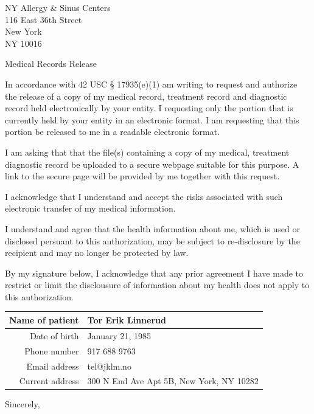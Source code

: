 \documentclass[10pt]{letter}
\makeatletter
\renewcommand{\closing}[1]{\par\nobreak\vspace{\parskip}%
\stopbreaks
\noindent
\ifx\@empty\fromaddress\else
\hspace*{\longindentation}\fi
\parbox{\indentedwidth}{\raggedright
    \ignorespaces #1\\[0.0in]%
    \ifx\@empty\fromsig
        \fromname
\else \fromsig \fi\strut}%
\par}
\makeatother
\begin{document}
\begin{letter}{NY Allergy \& Sinus Centers \\ 116 East 36th Street\\ New York\\ NY 10016}

\opening{Medical Records Release}

In accordance with 42 USC § 17935(e)(1) am writing to request and authorize the release of a copy of my medical record, treatment record and diagnostic record held  electronically by your entity. I requesting only the portion that is currently held by your entity in an electronic format. I am requesting that this portion be released to me in a readable electronic format.

I am asking that that the file(s) containing a copy of my medical, treatment diagnostic record be uploaded to a secure webpage suitable for this purpose. A link to the secure page will be provided by me together with this request.

I acknowledge that I understand and accept the risks associated with such electronic transfer of my medical information.

I understand and agree that the health information about me, which is used or disclosed persuant to this authorization, may be subject to re-disclosure by the recipient and may no longer be protected by law.

By my signature below, I acknowledge that any prior agreement I have made to restrict or limit the disclousure of information about my health does not apply to this authorization.

\hfill \break
\begin{tabular}{|r|l|}
\hline
Name of patient &  Tor Erik Linnerud \\ \hline
Date of birth & January 21, 1985 \\ \hline
Phone number & 917 688 9763 \\ \hline
Email address &  tel@jklm.no \\ \hline
Current address & 300 N End Ave Apt 5B, New York, NY 10282 \\
\hline
\end{tabular}
\hfill \break

\closing{Sincerely,}

\end{letter}
\end{document}

